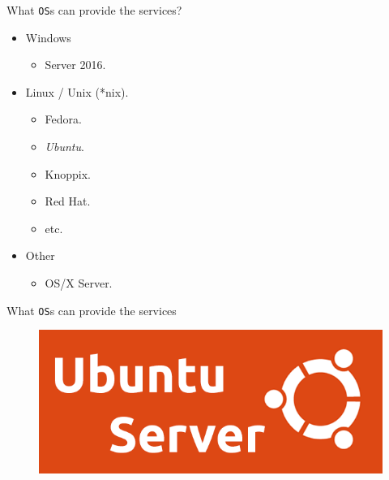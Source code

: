 \documentclass{beamer}
\begin{document}
\begin{frame}{What \texttt{OS}s can provide the services?}
  \begin{itemize}
    \item Windows
      \begin{itemize}
        \item Server 2016.
      \end{itemize}
    \item Linux / Unix (*nix).
      \begin{itemize}
        \item Fedora.
        \item \textit{Ubuntu}.
        \item Knoppix.
        \item Red Hat.
        \item etc.
      \end{itemize}
    \item Other
      \begin{itemize}
        \item OS/X Server.
      \end{itemize}
  \end{itemize}
\end{frame}

\begin{frame}{What \texttt{OS}s can provide the services}
  \begin{figure}
    \begin{center}
      \includegraphics[width=\linewidth]{UbuntuLogo.png}
    \end{center}
  \end{figure}
\end{frame}
\end{document}

